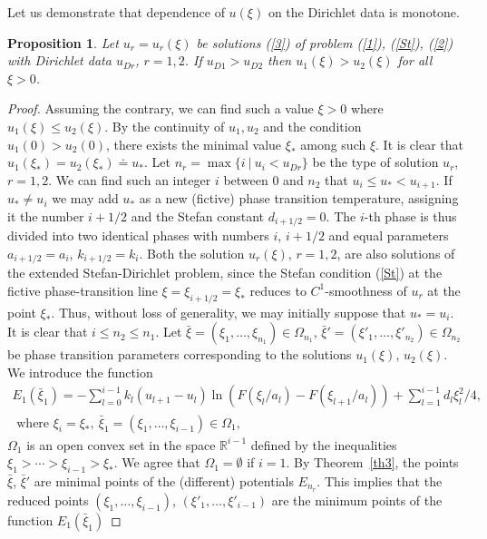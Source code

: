 \documentclass[10pt,a4paper]{amsart}
\newtheorem{proposition}{Proposition}[section]
\numberwithin{equation}{section}
\newcommand{\R}{{\mathbb R}}
\begin{document}
Let us demonstrate that dependence of $u(\xi)$ on the Dirichlet data is monotone.

\begin{proposition}\label{cor2}
Let $u_r=u_r(\xi)$ be solutions (\ref{3}) of problem (\ref{1}), (\ref{St}), (\ref{2}) with Dirichlet data $u_{Dr}$, $r=1,2$. If $u_{D1}>u_{D2}$ then $u_1(\xi)>u_2(\xi)$ for all $\xi>0$.
\end{proposition}

\begin{proof}

Assuming the contrary, we can find such a value $\xi>0$ where $u_1(\xi)\le u_2(\xi)$. By the continuity of $u_1,u_2$ and the condition $u_1(0)>u_2(0)$, there exists the minimal value $\xi_*$ among such $\xi$.
It is clear that $u_1(\xi_*)=u_2(\xi_*)\doteq u_*$. Let $n_r=\max\{i \ | \ u_i<u_{Dr}\}$ be the type of solution $u_r$, $r=1,2$. We can find such an integer $i$ between $0$ and $n_2$ that $u_i\le u_*<u_{i+1}$. If $u_*\not=u_i$ we may add $u_*$ as a new (fictive) phase transition temperature, assigning it  the number $i+1/2$ and the Stefan constant $d_{i+1/2}=0$. The $i$-th phase is thus divided into two identical phases with numbers $i$, $i+1/2$ and equal parameters $a_{i+1/2}=a_i$, $k_{i+1/2}=k_i$. Both the solution $u_r(\xi)$, $r=1,2$, are also solutions of the extended Stefan-Dirichlet problem, since the Stefan condition (\ref{St}) at the fictive phase-transition line $\xi=\xi_{i+1/2}=\xi_*$ reduces to $C^1$-smoothness of $u_r$ at the point $\xi_*$.
Thus, without loss of generality, we may initially suppose that $u_*=u_i$. It is clear that $i\le n_2\le n_1$. Let $\bar\xi=(\xi_1,\ldots,\xi_{n_1})\in\Omega_{n_1}$, $\bar\xi'=(\xi'_1,\ldots,\xi'_{n_2})\in\Omega_{n_2}$ be phase transition parameters corresponding to the solutions $u_1(\xi)$, $u_2(\xi)$.
 We introduce the function
\begin{align*} E_1(\bar\xi_1)=-\sum_{l=0}^{i-1} k_l(u_{l+1}-u_l)\ln (F(\xi_l/a_l)-F(\xi_{l+1}/a_l))+\sum_{l=1}^{i-1} d_l\xi_l^2/4, \\
\mbox{ where } \xi_i=\xi_*, \ \bar\xi_1=(\xi_1,\ldots,\xi_{i-1})\in\Omega_1,
\end{align*}
$\Omega_1$ is an open convex set in the space $\R^{i-1}$ defined by the inequalities $\xi_1>\cdots >\xi_{i-1}>\xi_*$. We agree that $\Omega_1=\emptyset$ if $i=1$. By Theorem~\ref{th3}, the points $\bar\xi$, $\bar\xi'$ are minimal points of the (different) potentials $E_{n_r}$. This implies that the reduced points
$(\xi_1,\ldots,\xi_{i-1})$, $(\xi'_1,\ldots,\xi'_{i-1})$ are the minimum points of the function $E_1(\bar\xi_1)$

\end{proof}
\end{document}

